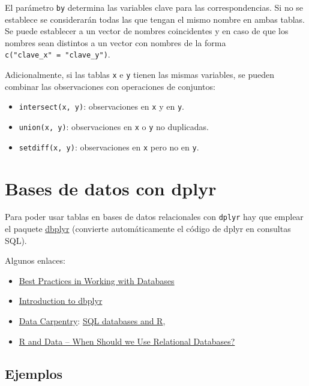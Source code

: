 \documentclass[
]{book}
\theoremstyle{break}
\theoremstyle{nonumberplain}
\begin{document}
El parámetro \texttt{by} determina las variables clave para las correspondencias.
Si no se establece se considerarán todas las que tengan el mismo nombre en ambas tablas.
Se puede establecer a un vector de nombres coincidentes y en caso de que los nombres sean distintos a un vector con nombres de la forma \texttt{c("clave\_x"\ =\ "clave\_y")}.

Adicionalmente, si las tablas \texttt{x} e \texttt{y} tienen las mismas variables, se pueden combinar las observaciones con operaciones de conjuntos:

\begin{itemize}
\item
  \texttt{intersect(x,\ y)}: observaciones en \texttt{x} y en \texttt{y}.
\item
  \texttt{union(x,\ y)}: observaciones en \texttt{x} o \texttt{y} no duplicadas.
\item
  \texttt{setdiff(x,\ y)}: observaciones en \texttt{x} pero no en \texttt{y}.
\end{itemize}

\section{Bases de datos con dplyr}\label{dbplyr}

Para poder usar tablas en bases de datos relacionales con \texttt{dplyr} hay que emplear el paquete \href{https://dbplyr.tidyverse.org}{dbplyr} (convierte automáticamente el código de dplyr en consultas SQL).

Algunos enlaces:

\begin{itemize}
\item
  \href{https://solutions.posit.co/connections/db}{Best Practices in Working with Databases}
\item
  \href{https://dbplyr.tidyverse.org/articles/dbplyr.html}{Introduction to dbplyr}
\item
  \href{https://datacarpentry.org/R-ecology-lesson/index.html}{Data Carpentry}:
  \href{https://datacarpentry.org/R-ecology-lesson/05-r-and-databases.html}{SQL databases and R},
\item
  \href{https://intellixus.com/2018/06/29/r-and-data-when-should-we-use-relational-databases}{R and Data -- When Should we Use Relational Databases?}
\end{itemize}

\subsection{Ejemplos}\label{ejemplos}
\end{document}
